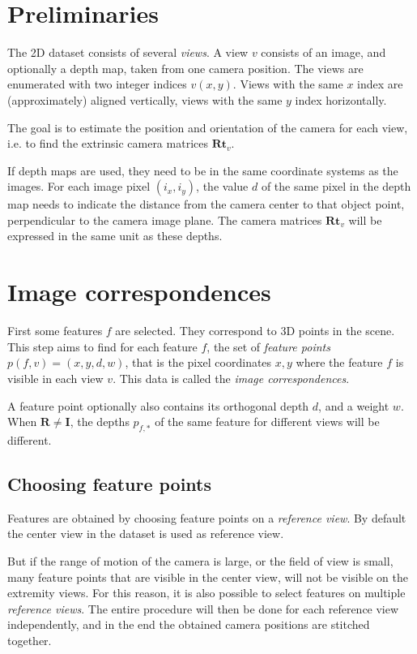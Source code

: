 \documentclass[11pt]{scrreprt}
\newcommand{\matr}[1]{\mathbf{#1}}
\begin{document}
\section{Preliminaries}
The 2D dataset consists of several \emph{views}. A view $v$ consists of an image, and optionally a depth map, taken from one camera position. The views are enumerated with two integer indices $v(x,y)$. Views with the same $x$ index are (approximately) aligned vertically, views with the same $y$ index horizontally.

The goal is to estimate the position and orientation of the camera for each view, i.e. to find the extrinsic camera matrices $\matr{Rt}_v$.

If depth maps are used, they need to be in the same coordinate systems as the images. For each image pixel $(i_x,i_y)$, the value $d$ of the same pixel in the depth map needs to indicate the distance from the camera center to that object point, perpendicular to the camera image plane. The camera matrices $\matr{Rt}_v$ will be expressed in the same unit as these depths.

 
\section{Image correspondences}
First some features $f$ are selected. They correspond to 3D points in the scene. This step aims to find for each feature $f$, the set of \emph{feature points} $p(f,v) = (x,y,d,w)$, that is the pixel coordinates $x,y$ where the feature $f$ is visible in each view $v$. This data is called the \emph{image correspondences}.

A feature point optionally also contains its orthogonal depth $d$, and a weight $w$. When $\matr{R} \neq \matr{I}$, the depths $p_{f,*}$ of the same feature for different views will be different.


\subsection{Choosing feature points}
Features are obtained by choosing feature points on a \emph{reference view}. By default the center view in the dataset is used as reference view.

But if the range of motion of the camera is large, or the field of view is small, many feature points that are visible in the center view, will not be visible on the extremity views. For this reason, it is also possible to select features on multiple \emph{reference views}. The entire procedure will then be done for each reference view independently, and in the end the obtained camera positions are stitched together.
\end{document}
